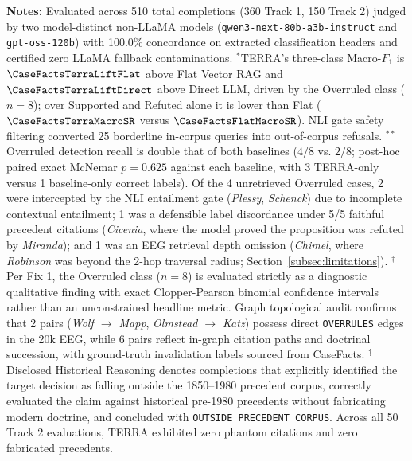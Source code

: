 \raggedright \fontsize{8.5}{10.5}\selectfont \textbf{Notes:} Evaluated across 510 total completions (360 Track 1, 150 Track 2) judged by two model-distinct non-LLaMA models (\texttt{qwen3-\allowbreak{}next-\allowbreak{}80b-\allowbreak{}a3b-\allowbreak{}instruct} and \texttt{gpt-\allowbreak{}oss-\allowbreak{}120b}) with 100.0\% concordance on extracted classification headers and certified zero LLaMA fallback contaminations.
$^*$TERRA's three-class Macro-$F_1$ is $\CaseFactsTerraLiftFlat$ above Flat Vector RAG and $\CaseFactsTerraLiftDirect$ above Direct LLM, driven by the Overruled class ($n=8$); over Supported and Refuted alone it is lower than Flat ($\CaseFactsTerraMacroSR$ versus $\CaseFactsFlatMacroSR$). NLI gate safety filtering converted 25 borderline in-corpus queries into out-of-corpus refusals.
$^{**}$Overruled detection recall is double that of both baselines ($4/8$ vs. $2/8$; post-hoc paired exact McNemar $p=0.625$ against each baseline, with 3 TERRA-only versus 1 baseline-only correct labels). Of the 4 unretrieved Overruled cases, 2 were intercepted by the NLI entailment gate (\textit{Plessy}, \textit{Schenck}) due to incomplete contextual entailment; 1 was a defensible label discordance under 5/5 faithful precedent citations (\textit{Cicenia}, where the model proved the proposition was refuted by \textit{Miranda}); and 1 was an EEG retrieval depth omission (\textit{Chimel}, where \textit{Robinson} was beyond the 2-hop traversal radius; Section~\ref{subsec:limitations}).
$^\dagger$Per Fix 1, the Overruled class ($n=8$) is evaluated strictly as a diagnostic qualitative finding with exact Clopper-Pearson binomial confidence intervals rather than an unconstrained headline metric. Graph topological audit confirms that 2 pairs (\textit{Wolf $\to$ Mapp}, \textit{Olmstead $\to$ Katz}) possess direct \texttt{OVERRULES} edges in the 20k EEG, while 6 pairs reflect in-graph citation paths and doctrinal succession, with ground-truth invalidation labels sourced from CaseFacts.
$^\ddagger$Disclosed Historical Reasoning denotes completions that explicitly identified the target decision as falling outside the 1850--1980 precedent corpus, correctly evaluated the claim against historical pre-1980 precedents without fabricating modern doctrine, and concluded with \texttt{OUTSIDE PRECEDENT CORPUS}. Across all 50 Track 2 evaluations, TERRA exhibited zero phantom citations and zero fabricated precedents.
\endgroup




